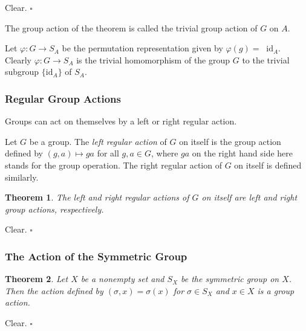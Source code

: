 \documentclass[10pt]{article}
\newtheorem{theorem}{Theorem}[section]
\newenvironment{proof}[1][Proof]{\begin{trivlist}
\item[\hskip \labelsep {\itshape #1}]}{\end{trivlist}}
\newenvironment{definition}[1][Definition]{\begin{trivlist}
\item[\hskip \labelsep {\bfseries #1}]}{\end{trivlist}}
\newenvironment{example}[1][Example]{\begin{trivlist}
\item[\hskip \labelsep {\bfseries #1}]}{\end{trivlist}}
\begin{document}
\begin{proof}
Clear. $\square$
\end{proof}

\begin{definition}
The group action of the theorem is called the trivial group action of $G$ on $A$.
\end{definition}

\begin{example}
Let $\varphi : G \to S_A$ be the permutation representation given by $\varphi(g) = \;\;\mbox{id}_A$. Clearly $\varphi : G \to S_A$ is the trivial homomorphism of the group $G$ to the trivial subgroup $\{\mbox{id}_A\}$ of $S_A$.
\end{example}

\subsubsection{Regular Group Actions}

Groups can act on themselves by a left or right regular action.

\begin{definition}
Let $G$ be a group. The \emph{left regular action} of $G$ on itself is the group action defined by $(g, a) \mapsto ga$ for all $g, a \in G$, where $ga$ on the right hand side here stands for the group operation. The right regular action of $G$ on itself is defined similarly.
\end{definition}

\begin{theorem}
The left and right regular actions of $G$ on itself are left and right group actions, respectively.
\end{theorem}

\begin{proof}
Clear. $\square$
\end{proof}

\subsubsection{The Action of the Symmetric Group}

\begin{theorem}
Let $X$ be a nonempty set and $S_X$ be the symmetric group on $X$. Then the action defined by $(\sigma, x) = \sigma(x)$ for $\sigma \in S_X$ and $x \in X$ is a group action.
\end{theorem}

\begin{proof}
Clear. $\square$
\end{proof}
\end{document}

